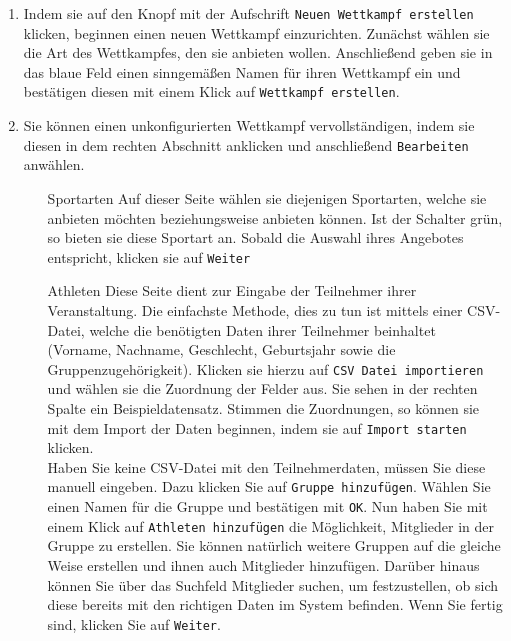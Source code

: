 \documentclass[11pt,a4paper,titlepage,german]{article}
\begin{document}
\begin{enumerate}
				\item {}
					Indem sie auf den Knopf mit der Aufschrift \texttt{Neuen Wettkampf erstellen} klicken, beginnen einen neuen Wettkampf einzurichten. Zunächst wählen sie die Art des Wettkampfes, den sie anbieten wollen. Anschließend geben sie in das blaue Feld einen sinngemäßen Namen für ihren Wettkampf ein und bestätigen diesen mit einem Klick auf \texttt{Wettkampf erstellen}.
				
				\item {}
					Sie können einen unkonfigurierten Wettkampf vervollständigen, indem sie diesen in dem rechten Abschnitt anklicken und anschließend \texttt{Bearbeiten} anwählen.
				
					\begin{enumerate}
						\item[Sportarten] Auf dieser Seite wählen sie diejenigen Sportarten, welche sie anbieten möchten beziehungsweise anbieten können. Ist der Schalter grün, so bieten sie diese Sportart an. Sobald die Auswahl ihres Angebotes entspricht, klicken sie auf \texttt{Weiter}
						
						\item[Athleten] Diese Seite dient zur Eingabe der Teilnehmer ihrer Veranstaltung. Die einfachste Methode, dies zu tun ist mittels einer CSV-Datei, welche die benötigten Daten ihrer Teilnehmer beinhaltet (Vorname, Nachname, Geschlecht, Geburtsjahr sowie die Gruppenzugehörigkeit). Klicken sie hierzu auf \texttt{CSV Datei importieren} und wählen sie die Zuordnung der Felder aus. Sie sehen in der rechten Spalte ein Beispieldatensatz. Stimmen die Zuordnungen, so können sie mit dem Import der Daten beginnen, indem sie auf \texttt{Import starten} klicken.\\
						Haben Sie keine CSV-Datei mit den Teilnehmerdaten, müssen Sie diese manuell eingeben. Dazu klicken Sie auf \texttt{Gruppe hinzufügen}. Wählen Sie einen Namen für die Gruppe und bestätigen mit \texttt{OK}. Nun haben Sie mit einem Klick auf \texttt{Athleten hinzufügen} die Möglichkeit, Mitglieder in der Gruppe zu erstellen. Sie können natürlich weitere Gruppen auf die gleiche Weise erstellen und ihnen auch Mitglieder hinzufügen. Darüber hinaus können Sie über das  Suchfeld Mitglieder suchen, um festzustellen, ob sich diese bereits mit den richtigen Daten im System befinden. Wenn Sie fertig sind, klicken Sie auf \texttt{Weiter}.
						

\end{enumerate}
\end{enumerate}
\end{document}
